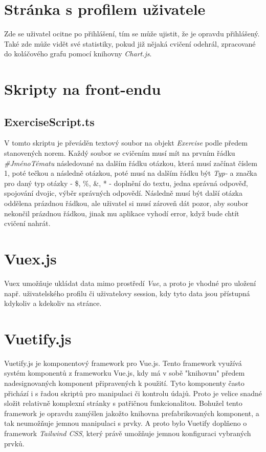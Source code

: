 \documentclass[12pt]{report}
\begin{document}
\section{Stránka s profilem uživatele}
Zde se uživatel ocitne po přihlášení, tím se může ujistit, že je opravdu přihlášený. Také zde může vidět své statistiky, pokud již nějaká cvičení odehrál, zpracované do koláčového grafu pomocí knihovny \emph{Chart.js}.

\section{Skripty na front-endu}
\subsection{ExerciseScript.ts}
V tomto skriptu je převáděn textový soubor na objekt \emph{Exercise} podle předem stanovených norem. Každý soubor se cvičením musí mít na prvním řádku \emph{\#JménoTématu} následované na dalším řádku otázkou, která musí začínat číslem 1, poté tečkou a následně otázkou, poté musí na dalším řádku být \emph{Typ-} a značka pro daný typ otázky - \$, \%, \&, *  - doplnění do textu, jedna správná odpověď, spojování dvojic, výběr správných odpovědí. Následně musí být další otázka oddělena prázdnou řádkou, ale uživatel si musí zároveň dát pozor, aby soubor nekončil prázdnou řádkou, jinak mu aplikace vyhodí error, když bude chtít cvičení nahrát.
\newpage

\section{Vuex.js}
Vuex umožňuje ukládat data mimo prostředí \emph{Vue}, a proto je vhodné pro uložení např. uživatelského profilu či uživatelovy session, kdy tyto data jsou přístupná kdykoliv a kdekoliv na stránce.

\section{Vuetify.js}
Vuetify.js je komponentový framework pro Vue.js. Tento framework využívá systém komponentů z frameworku Vue.js, kdy má v sobě "knihovnu" předem nadesignovaných komponent připravených k použití. Tyto komponenty často přichází i s řadou skriptů pro manipulaci či kontrolu údajů. Proto je velice snadné složit relativně komplexní stránky s patřičnou funkcionalitou. Bohužel tento framework je opravdu zamýšlen jakožto knihovna prefabrikovaných komponent, a tak neumožňuje jemnou manipulaci s prvky. A proto bylo Vuetify doplňeno o framework \emph{Tailwind CSS}, který právě umožňuje jemnou konfiguraci vybraných prvků.
\end{document}
